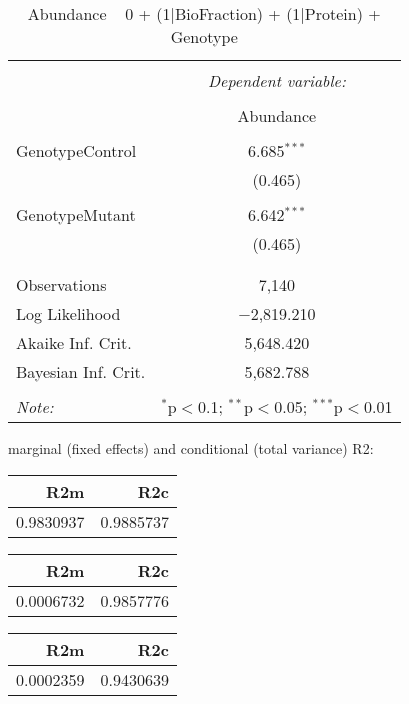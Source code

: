 \documentclass[11pt]{report}
\begin{document}
\begin{table}[!htbp] \centering 
  \caption{Abundance ~ 0 + (1|BioFraction) + (1|Protein) + Genotype} 
  \label{} 
\begin{tabular}{@{\extracolsep{5pt}}lc} 
\\[-1.8ex]\hline 
\hline \\[-1.8ex] 
 & \multicolumn{1}{c}{\textit{Dependent variable:}} \\ 
\cline{2-2} 
\\[-1.8ex] & Abundance \\ 
\hline \\[-1.8ex] 
 GenotypeControl & 6.685$^{***}$ \\ 
  & (0.465) \\ 
  & \\ 
 GenotypeMutant & 6.642$^{***}$ \\ 
  & (0.465) \\ 
  & \\ 
\hline \\[-1.8ex] 
Observations & 7,140 \\ 
Log Likelihood & $-$2,819.210 \\ 
Akaike Inf. Crit. & 5,648.420 \\ 
Bayesian Inf. Crit. & 5,682.788 \\ 
\hline 
\hline \\[-1.8ex] 
\textit{Note:}  & \multicolumn{1}{r}{$^{*}$p$<$0.1; $^{**}$p$<$0.05; $^{***}$p$<$0.01} \\ 
\end{tabular} 
\end{table} 
marginal (fixed effects) and conditional (total variance) R2:

\begin{tabular}{r|r}
\hline
R2m & R2c\\
\hline
0.9830937 & 0.9885737\\
\hline
\end{tabular}

\begin{tabular}{r|r}
\hline
R2m & R2c\\
\hline
0.0006732 & 0.9857776\\
\hline
\end{tabular}

\begin{tabular}{r|r}
\hline
R2m & R2c\\
\hline
0.0002359 & 0.9430639\\
\hline
\end{tabular}
\end{document}
